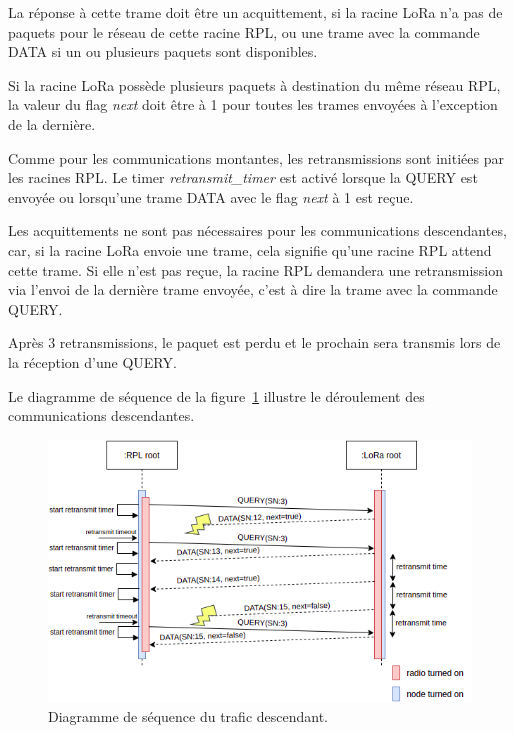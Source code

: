     La réponse à cette trame doit être un acquittement, si la racine LoRa n'a pas de paquets pour le réseau de cette racine RPL, ou une trame avec la commande DATA si un ou plusieurs paquets sont disponibles.

    Si la racine LoRa possède plusieurs paquets à destination du même réseau RPL, la valeur du flag \textit{next} doit être à 1 pour toutes les trames envoyées à l'exception de la dernière.

    Comme pour les communications montantes, les retransmissions sont initiées par les racines RPL.
    Le timer \textit{retransmit\_timer} est activé lorsque la QUERY est envoyée ou lorsqu'une trame DATA avec le flag \textit{next} à 1 est reçue.

    Les acquittements ne sont pas nécessaires pour les communications descendantes, car, si la racine LoRa envoie une trame, cela signifie qu'une racine RPL attend cette trame. Si elle n'est pas reçue, la racine RPL demandera une retransmission via l'envoi de la dernière trame envoyée, c'est à dire la trame avec la commande QUERY.

    Après 3 retransmissions, le paquet est perdu et le prochain sera transmis lors de la réception d'une QUERY.

    Le diagramme de séquence de la figure~\ref{fig:proto-seq-downward} illustre le déroulement des communications descendantes.
    \begin{figure}[H]
        \centering
        \includegraphics[scale=0.6]{res/pictures/loramac-sequence-DOWNWARD.drawio.png}
        \caption{Diagramme de séquence du trafic descendant.}
        \label{fig:proto-seq-downward}
    \end{figure}


